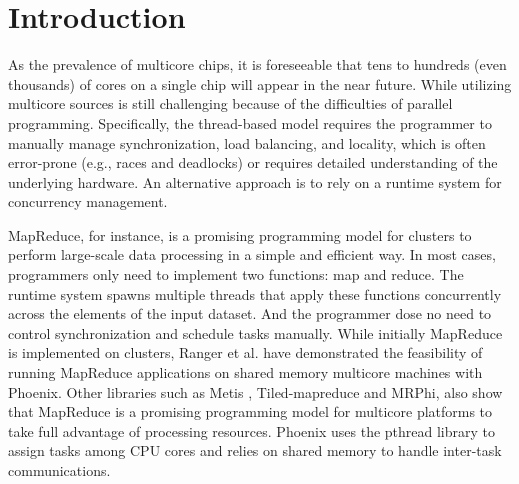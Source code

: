 \section{Introduction}
\label{sec:intro}



As the prevalence of multicore chips,
it is foreseeable that tens to hundreds (even thousands) of cores on a single chip
will appear in the near future\cite{Borkar2007core}.
While utilizing multicore sources is still challenging
because of the difficulties of parallel programming.
Specifically, the thread-based model requires the programmer to manually
manage synchronization, load balancing, and locality, which is
often error-prone (e.g., races and deadlocks) or requires detailed
understanding of the underlying hardware.
An alternative approach is to rely on a runtime system for
concurrency management. 

MapReduce\cite{dean2004mapreduce}, 
for instance, is a promising programming model for clusters
to perform large-scale data processing
in a simple and efficient way.
In most cases, programmers only need to implement two functions:
map and reduce.
The runtime system spawns multiple threads that apply
these functions concurrently across the elements of the input
dataset. 
And the programmer dose no need to control synchronization 
and schedule tasks manually.
While initially MapReduce is implemented on clusters, Ranger
et al. have demonstrated the feasibility of running MapReduce
applications on shared memory multicore machines with 
Phoenix\cite{ranger2007phoenix}.
Other libraries such as Metis\cite{mao2010metis} 
, Tiled-mapreduce\cite{chen2010tiled} and MRPhi\cite{lu2013mrphi}, 
also show that MapReduce is a promising programming model 
for multicore platforms to take full advantage of  
processing resources.
Phoenix uses the pthread library to assign tasks 
among CPU cores and relies on
shared memory to handle inter-task communications.

